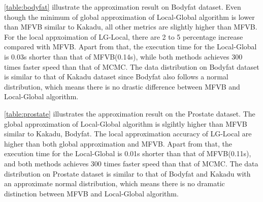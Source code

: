 \autoref{table:bodyfat} illustrate the approximation result on Bodyfat dataset. Even though the minimum of global approximation of Local-Global algorithm is lower than MFVB similar to Kakadu, all other metrics are slightly higher than MFVB. For the local appxoimation of LG-Local, there are 2 to 5 percentage increase compared with MFVB. Apart from that, the execution time for the Local-Global is 0.03s shorter than that of MFVB(0.14s), while both methods achieves 300 times faster speed than that of MCMC.
The data distribution on Bodyfat dataset is similar to that of Kakadu dataset since Bodyfat also follows a normal distribution, which means there is no drastic difference between MFVB and Local-Global algorithm.





\newpage
\begin{table}[!h]
	\caption{Experiment Result on Prostate dataset}
	\label{table:prostate}
\end{table}
\autoref{table:prostate} illustrates the approximation result on the Prostate dataset.  The global approximation of Local-Global algorithm is slgihtly higher than MFVB similar to Kakadu, Bodyfat. The local approximation accuracy of LG-Local are higher than both global approximation and MFVB. Apart from that, the execution time for the Local-Global is 0.01s shorter than that of MFVB(0.11s), and both methods achieves 300 times faster speed than that of MCMC.
The data distribution on Prostate dataset is similar to that of Bodyfat and Kakadu with an approximate normal distribution, which means there is no dramatic distinction between MFVB and Local-Global algorithm.

